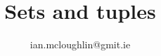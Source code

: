 \documentclass[dvipsnames, hidelinks, t, fleqn]{beamer}
\begin{document}
    \title{Sets and tuples}
    \subtitle{}
    \author{ian.mcloughlin@gmit.ie}
    \date{}
  
    \begin{frame}
      \titlepage
    \end{frame}
  
     
  
\end{document}
